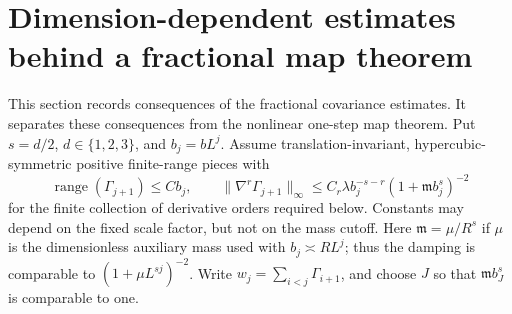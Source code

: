 \documentclass[11pt]{article}
\begin{document}
\section{Dimension-dependent estimates behind a fractional map theorem}
\label{completion:map-support}
This section records consequences of the fractional covariance estimates.
It separates these consequences from the nonlinear one-step map theorem.
Put \(s=d/2\), \(d\in\{1,2,3\}\), and \(b_j=bL^j\).
Assume translation-invariant, hypercubic-symmetric positive finite-range
pieces with
\[
 \operatorname{range}(\Gamma_{j+1})\le Cb_j,\qquad
 \|\nabla^r\Gamma_{j+1}\|_\infty
 \le C_r\lambda b_j^{-s-r}(1+\mathfrak m b_j^s)^{-2}
\]
for the finite collection of derivative orders required below. Constants
may depend on the fixed scale factor, but not on the mass cutoff.
Here \(\mathfrak m=\mu/R^s\) if \(\mu\) is the dimensionless
auxiliary mass used with \(b_j\asymp RL^j\); thus the damping is comparable to
\((1+\mu L^{sj})^{-2}\). Write
\(w_j=\sum_{i<j}\Gamma_{i+1}\), and choose \(J\) so that
\(\mathfrak m b_J^s\) is comparable to one.
\end{document}

